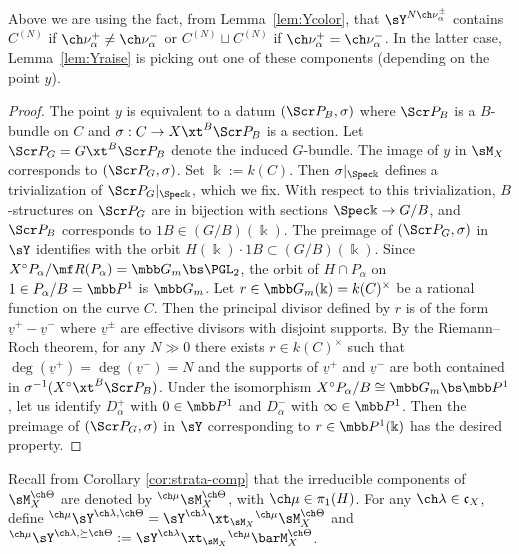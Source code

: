 Above we are using the fact, from Lemma~\ref{lem:Ycolor}, that
$\sY^{N\ch\nu_\alpha^\pm}$ contains $C^{(N)}$ if $\ch\nu_\alpha^+ \ne \ch\nu_\alpha^-$
or $C^{(N)}\sqcup C^{(N)}$ if $\ch\nu_\alpha^+ = \ch\nu_\alpha^-$.
In the latter case, Lemma~\ref{lem:Yraise} is picking out one of these components
(depending on the point $y$).

\begin{proof}
The point $y$ is equivalent to a datum $(\Scr P_B, \sigma)$
where $\Scr P_B$ is a $B$-bundle on $C$ and $\sigma : C \to X \xt^B \Scr P_B$ is a section.
Let $\Scr P_G = G \xt^B \Scr P_B$ denote the induced $G$-bundle.
The image of $y$ in $\sM_X$ corresponds to $(\Scr P_G, \sigma)$.
Set $\Bbbk := k(C)$. Then $\sigma|_{\Spec \Bbbk}$ defines a trivialization
of $\Scr P_G|_{\Spec \Bbbk}$, which we fix.
With respect to this trivialization, $B$-structures on $\Scr P_G$
are in bijection with sections $\Spec \Bbbk \to G/B$,
and $\Scr P_B$ corresponds to $1B \in (G/B)(\Bbbk)$.
The preimage of $(\Scr P_G,\sigma)$ in $\sY$ identifies with the
orbit
$H(\Bbbk)\cdot 1B \subset (G/B)(\Bbbk)$.
Since $X^\circ P_\alpha/\mf R(P_\alpha)=\mbb G_m\bs \PGL_2$, the orbit of
$H\cap P_\alpha$ on $1\in P_\alpha/B = \mbb P^1$ is
$\mbb G_m$. Let $r \in \mbb G_m(\Bbbk) = k(C)^\times$
be a rational function on the curve $C$.
Then the principal divisor defined by $r$ is of the form
$\underline v^+ - \underline v^-$ where $\underline v^\pm$
are effective divisors with disjoint supports.
By the Riemann--Roch theorem, for any $N \gg 0$
there exists $r \in k(C)^\times$ such that $\deg(\underline v^+)=\deg(\underline v^-)=N$ and the supports of $\underline v^+$ and $\underline v^-$
are both contained in $\sigma^{-1}(X^\circ \xt^B \Scr P_B)$.
Under the isomorphism $X^\circ P_\alpha/B \cong \mbb G_m \bs \mbb P^1$,
let us identify $D_\alpha^+$ with $0\in \mbb P^1$ and
$D_\alpha^-$ with $\infty \in \mbb P^1$.
Then the preimage of $(\Scr P_G,\sigma)$ in $\sY$ corresponding to
$r\in \mbb P^1(\Bbbk)$ has the desired property.
\end{proof}


Recall from Corollary \ref{cor:strata-comp} that the irreducible components of $\sM_X^{\ch\Theta}$ are denoted by ${^{\ch\mu}\sM_X^{\ch\Theta}}$, with $\ch\mu\in \pi_1(H)$.
For any $\ch\lambda\in \mathfrak c_X$, define
$^{\ch\mu}\sY^{\ch\lambda,\ch\Theta} = \sY^{\ch\lambda} \xt_{\sM_X} {^{\ch\mu}\sM_X^{\ch\Theta}}$
and
$^{\ch\mu}\sY^{\ch\lambda,\succeq \ch\Theta} := \sY^{\ch\lambda} \xt_{\sM_X}
{^{\ch\mu}}\barM_X^{\ch\Theta}$.


